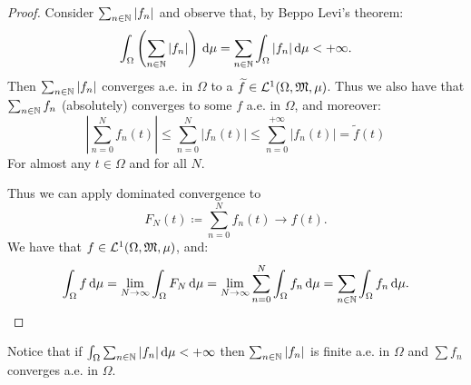 \begin{proof}
	Consider $\sum_{n\in \mathbb N}|f_n|$ and observe that, by Beppo Levi's theorem:
	$$
		\int_\Omega \left(\sum_{n\in \mathbb N} |f_n|\right) \,\mathrm d\mu 
		= \sum_{n\in \mathbb N} \int_\Omega |f_n| \,\mathrm d\mu 
		< +\infty
	.
	$$
	Then $\sum_{n\in \mathbb N} |f_n|$ converges a.e. in $\Omega$ to a $\widetilde f \in \mathcal L^1(\Omega, \mathfrak M, \mu)$.
	Thus we also have that $\sum_{n\in \mathbb N} f_n$ (absolutely) converges to some $f$ a.e. in $\Omega$, and moreover:
	$$
		\left| \sum_{n=0}^N f_n (t) \right|
		\leq \sum_{n=0}^N |f_n (t)|
		\leq \sum_{n=0}^{+\infty} |f_n (t)|
		= \tilde f(t)
	$$
	For almost any $ t \in \Omega$ and for all $N$.
	
	Thus we can apply dominated convergence to 
	$$
		F_N(t) 
		\coloneqq \sum_{n=0}^N f_n(t) \to f(t)
	.
	$$
	We have that $f\in \mathcal L^1(\Omega, \mathfrak M, \mu)$, and:
	$$
		\int_\Omega f \,\mathrm d\mu
		= \lim\limits_{N \to \infty} \int_\Omega F_N \,\mathrm d\mu
		= \lim\limits_{N \to \infty} \sum_{n=0}^N \int_\Omega f_n \,\mathrm d\mu
		= \sum_{n\in\mathbb N} \int_\Omega f_n \,\mathrm d\mu
	.
	$$
\end{proof}
Notice that if $\int_\Omega \sum_{n \in \mathbb N} |f_n| \,\mathrm d\mu < +\infty$ then $\sum_{n \in \mathbb N} |f_n|$ is finite a.e. in $\Omega$ and $\sum f_n$ converges a.e. in $\Omega$.


